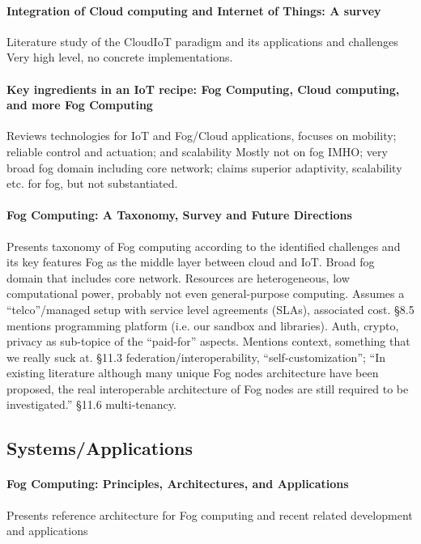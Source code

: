 \paragraph{Integration of Cloud computing and Internet of Things: A survey}\cite{botta_integration_2016}
Literature study of the CloudIoT paradigm and its applications and challenges
Very high level, no concrete implementations.

\paragraph{Key ingredients in an IoT recipe: Fog Computing, Cloud computing, and more Fog Computing}\cite{yannuzzi_key_2014}
Reviews technologies for IoT and Fog/Cloud applications, focuses on mobility; reliable control and actuation; and scalability
Mostly not on fog IMHO; very broad fog domain including core network; claims superior
adaptivity, scalability etc. for fog, but not substantiated. 


\paragraph{Fog Computing: A Taxonomy, Survey and Future Directions}\cite{mahmud_fog_2016}
Presents taxonomy of Fog computing according to the identified challenges and its key features
Fog as the middle layer between cloud and IoT. Broad fog domain that includes core network.
Resources are heterogeneous, low computational power, probably not even general-purpose computing.
Assumes a ``telco''/managed setup with service level agreements (SLAs), associated cost.
§8.5 mentions programming platform (i.e. our sandbox and libraries). Auth, crypto, privacy
as sub-topice of the ``paid-for'' aspects. Mentions context, something that we really suck at.
§11.3 federation/interoperability, ``self-customization'';
``In existing
literature although many unique Fog nodes architecture have been proposed, the real
interoperable architecture of Fog nodes are still required to be investigated.''
§11.6 multi-tenancy.


\subsection{Systems/Applications}

\paragraph{Fog Computing: Principles, Architectures, and Applications}\cite{dastjerdi_fog_2016}
Presents reference architecture for Fog computing and recent related development and applications

